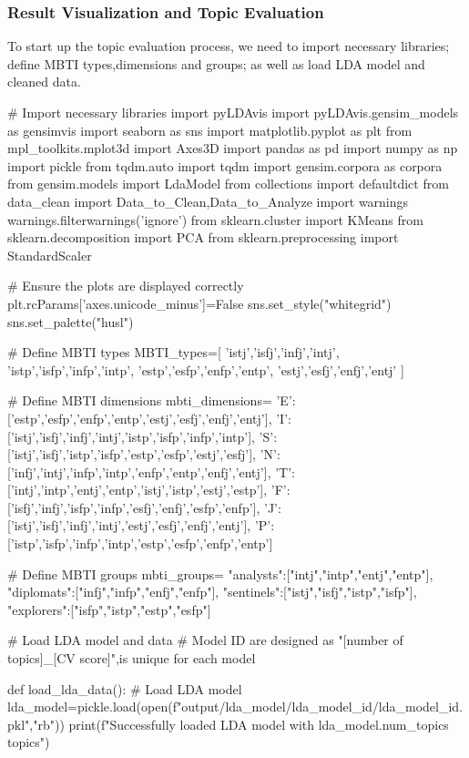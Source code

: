 \documentclass[12pt]{article}
\begin{document}
	\subsubsection{Result Visualization and Topic Evaluation}
	To start up the topic evaluation process, we need to import necessary libraries; define MBTI types,dimensions and groups; as well as load LDA model and cleaned data.
		\begin{python}
# Import necessary libraries
import pyLDAvis
import pyLDAvis.gensim_models as gensimvis
import seaborn as sns
import matplotlib.pyplot as plt
from mpl_toolkits.mplot3d import Axes3D
import pandas as pd
import numpy as np
import pickle
from tqdm.auto import tqdm
import gensim.corpora as corpora
from gensim.models import LdaModel
from collections import defaultdict
from data_clean import Data_to_Clean,Data_to_Analyze
import warnings
warnings.filterwarnings('ignore')
from sklearn.cluster import KMeans
from sklearn.decomposition import PCA
from sklearn.preprocessing import StandardScaler

# Ensure the plots are displayed correctly
plt.rcParams['axes.unicode_minus']=False
sns.set_style("whitegrid")
sns.set_palette("husl")

# Define MBTI types
MBTI_types=[
    'istj','isfj','infj','intj',
    'istp','isfp','infp','intp',
    'estp','esfp','enfp','entp',
    'estj','esfj','enfj','entj'
]

# Define MBTI dimensions
mbti_dimensions={
    'E': ['estp','esfp','enfp','entp','estj','esfj','enfj','entj'],
    'I': ['istj','isfj','infj','intj','istp','isfp','infp','intp'],
    'S': ['istj','isfj','istp','isfp','estp','esfp','estj','esfj'],
    'N': ['infj','intj','infp','intp','enfp','entp','enfj','entj'],
    'T': ['intj','intp','entj','entp','istj','istp','estj','estp'],
    'F': ['isfj','infj','isfp','infp','esfj','enfj','esfp','enfp'],
    'J': ['istj','isfj','infj','intj','estj','esfj','enfj','entj'],
    'P': ['istp','isfp','infp','intp','estp','esfp','enfp','entp']
}

# Define MBTI groups
mbti_groups={
    "analysts":["intj","intp","entj","entp"],
    "diplomats":["infj","infp","enfj","enfp"],
    "sentinels":["istj","isfj","istp","isfp"],
    "explorers":["isfp","istp","estp","esfp"]
}

# Load LDA model and data
# Model ID are designed as "[number of topics]_[CV score]",is unique for each model


def load_lda_data():
    # Load LDA model
    lda_model=pickle.load(open(f"output/lda_model/lda_{model_id}/lda_{model_id}.pkl","rb"))
    print(f"Successfully loaded LDA model with {lda_model.num_topics} topics")
    

\end{python}
\end{document}
